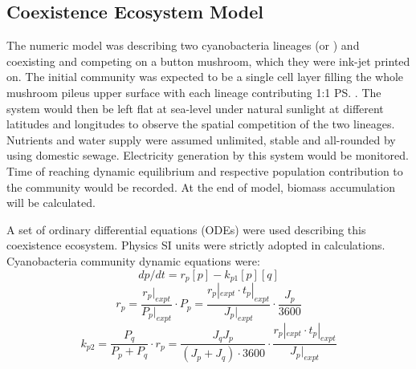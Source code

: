 \documentclass[../thesis.tex]{subfiles} %
\begin{document}
\subsection{Coexistence Ecosystem Model}

The numeric model was describing two cyanobacteria lineages \Ss\autocite{sawa2017electricity} (or \As)\autocite{joshi2018bacterial} and \Cs\autocite{baque2013boss,nurnberg2018photochemistry} coexisting and competing on a button mushroom,\autocite{joshi2018bacterial} which they were ink-jet printed on.  The initial community was expected to be a single cell layer filling the whole mushroom pileus upper surface with each lineage contributing 1:1 \ps.  The system would then be left flat at sea-level under natural sunlight at different latitudes and longitudes to observe the spatial competition of the two lineages.  Nutrients and water supply were assumed unlimited, stable and all-rounded by using domestic sewage.\autocite{markou2014microalgal}  Electricity generation by this system would be monitored.  Time of reaching dynamic equilibrium and respective population contribution to the community would be recorded.  At the end of model, biomass accumulation will be calculated.

A set of ordinary differential equations (ODEs) were used describing this coexistence ecosystem.  Physics SI units were strictly adopted in calculations.  Cyanobacteria community dynamic equations were:
\begin{equation}\label{eq:main}
    dp/dt = r_p [p] - k_{p1} [p][q]
\end{equation}
\begin{equation}\label{eq:growth}
    r_p = \dfrac{r_p|_{expt}}{P_p|_{expt}}\cdot P_p = \dfrac{r_p|_{expt}\cdot t_p|_{expt}}{J_p|_{expt}}\cdot\dfrac{J_p}{3600}
\end{equation}
\begin{equation}\label{eq:compete}
    k_{p2} = \dfrac{P_q}{P_p + P_q}\cdot r_p = \dfrac{J_q J_p}{(J_p + J_q)\cdot3600}\cdot \dfrac{r_p|_{expt}\cdot t_p|_{expt}}{J_p|_{expt}}
\end{equation}
\end{document}
